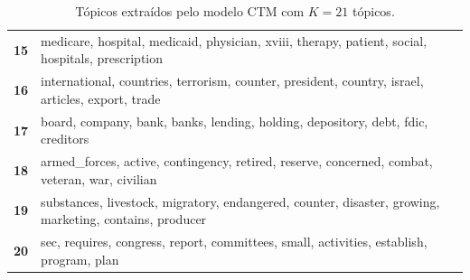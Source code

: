 \begin{table}[htpb]
\begin{tabularx}{\textwidth}{@{}l X@{}}
        \textbf{15} & medicare, hospital, medicaid, physician, xviii, therapy, patient, social, hospitals, prescription \\
        \textbf{16} & international, countries, terrorism, counter, president, country, israel, articles, export, trade \\
        \textbf{17} & board, company, bank, banks, lending, holding, depository, debt, fdic, creditors \\
        \textbf{18} & armed\_forces, active, contingency, retired, reserve, concerned, combat, veteran, war, civilian \\
        \textbf{19} & substances, livestock, migratory, endangered, counter, disaster, growing, marketing, contains, producer \\
        \textbf{20} & sec, requires, congress, report, committees, small, activities, establish, program, plan \\
        \bottomrule
    \end{tabularx}
    \caption{Tópicos extraídos pelo modelo CTM com $K=21$ tópicos.}
    \label{tab:topicos_ctm_21}
\end{table}
